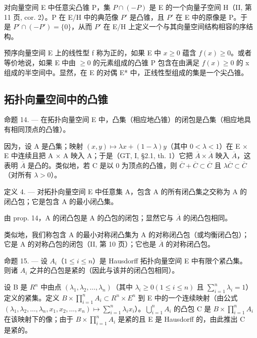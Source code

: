 对向量空间 E 中任意尖凸锥 P，集 \(P \cap (-P)\) 是 E 的一个向量子空间 H（II, 第 11 页, cor. 2）。P 在 E/H 中的典范像 \(P'\) 是凸锥，且 \(P'\) 在 E 中的原像是 P。于是 \(P' \cap (-P') = \{0\}\)，从而 \(P'\) 在 E/H 上定义一个与其向量空间结构相容的序结构。

预序向量空间 E 上的线性型 f 称为正的，如果 E 中 \(x \geqslant 0\) 蕴含 \(f(x) \geqslant 0\)。或者等价地说，如果 E 中由 \(\geqslant 0\) 的元素组成的凸锥 P 包含在由满足 \(f(x) \geqslant 0\) 的 x 组成的半空间中。显然，在 E 的对偶 E* 中，正线性型组成的集是一个尖凸锥。

\subsection{拓扑向量空间中的凸锥}

命题 14. --- 在拓扑向量空间 E 中，凸集（相应地凸锥）的闭包是凸集（相应地具有相同顶点的凸锥）。

因为，设 A 是凸集；映射 \((x, y) \mapsto \lambda x + (1 - \lambda)y\)（其中 \(0 < \lambda < 1\)）在 E × E 中连续且把 A × A 映入 A；于是（GT, I, §2.1, th. 1）它把 \(\overline{A} \times \overline{A}\) 映入 \(\overline{A}\)，这表明 \(\overline{A}\) 是凸的。类似地，若 C 是以 0 为顶点的凸锥，则 \(\overline{C} + \overline{C} \subset \overline{C}\) 且 \(\lambda\overline{C} \subset \overline{C}\)（对所有 \(\lambda > 0\)）。

定义 4. --- 对拓扑向量空间 E 中任意集 A，包含 A 的所有闭凸集之交称为 A 的闭凸包；它是包含 A 的最小闭凸集。

由 prop. 14，A 的闭凸包是 A 的凸包的闭包；显然它与 \(\overline{A}\) 的闭凸包相同。

类似地，我们称包含 A 的最小对称闭凸集为 A 的对称闭凸包（或均衡闭凸包）；它是 A 的对称凸包的闭包（II, 第 10 页）；它也是 \(\overline{A}\) 的对称闭凸包。

命题 15. --- 设 \(A_{i}\)（\(1 \leqslant i \leqslant n\)）是 Hausdorff 拓扑向量空间 E 中有限个紧凸集。则诸 \(A_{i}\) 之并的凸包是紧的（因此与该并的闭凸包相同）。

设 B 是 \(R^{n}\) 中由点 \((\lambda_{1},\lambda_{2},\ldots,\lambda_{n})\)（其中 \(\lambda_{i}\geqslant0(1\leqslant i\leqslant n)\) 且 \(\sum_{i=1}^{n}\lambda_{i}=1\)）定义的紧集。定义 \(B\times\prod_{i=1}^{n}A_{i}\subset R^{n}\times E^{n}\) 到 E 中的一个连续映射（由公式 \((\lambda_{1},\lambda_{2},\ldots,\lambda_{n},x_{1},x_{2},\ldots,x_{n})\mapsto\sum_{i=1}^{n}\lambda_{i}x_{i}\)）。\(\bigcup_{i=1}^{n}A_{i}\) 的凸包 C 是 \(B\times\prod_{i=1}^{n}A_{i}\) 在该映射下的像；由于 \(B\times\prod_{i=1}^{n}A_{i}\) 是紧的且 E 是 Hausdorff 的，由此推出 C 是紧的。

